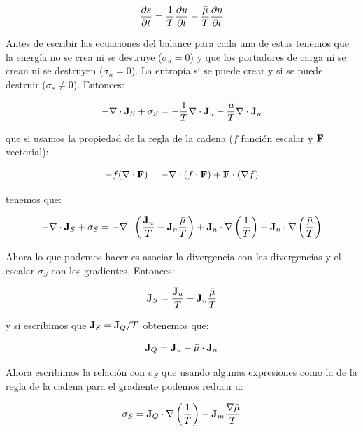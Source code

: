 \documentclass[12pt,a4paper,oneside]{book}
\begin{document}
\begin{equation}
\frac{\partial s}{\partial t} = \dfrac{1}{T} 
\frac{\partial u}{\partial t} - \dfrac{\bar{\mu}}{T} 
\frac{\partial n}{\partial t}
\end{equation} 

Antes de escribir las ecuaciones del balance para cada una de estas tenemos que la energía no se crea ni se destruye ($\sigma_u = 0$) y que los portadores de carga ni se crean ni se destruyen ($\sigma_n = 0$). La entropía si se puede crear y si se puede destruir ($\sigma_s \neq 0$). Entonces:

\begin{equation}
- \nabla \cdot \textbf{J}_S + \sigma_S = - \dfrac{1}{T} \nabla \cdot  \textbf{J}_u - \dfrac{\bar{\mu}}{T} \nabla \cdot \textbf{J}_n
\end{equation}

que si usamos la propiedad de la regla de la cadena ($f$ función escalar y $\textbf{F}$ vectorial):

$$ - f (\nabla \cdot \textbf{F}) = - \nabla \cdot (f  \cdot \textbf{F}) + \textbf{F} \cdot ( \nabla f ) $$

tenemos que:

\begin{equation}
- \nabla \cdot \textbf{J}_S + \sigma_S = -  \nabla \cdot  \left( \dfrac{\textbf{J}_u}{T} - \textbf{J}_n \dfrac{\bar{\mu}}{T}  \right) + \textbf{J}_u \cdot \nabla \left( \dfrac{1}{T} \right) + \textbf{J}_n \cdot \nabla \left( \dfrac{\bar{\mu}}{T} \right)
\end{equation}

Ahora lo que podemos hacer es asociar la divergencia con las divergencias y el escalar $\sigma_S$ con los gradientes. Entonces:

\begin{equation}
\textbf{J}_S = \dfrac{\textbf{J}_u}{T} - \textbf{J}_n \dfrac{\bar{\mu}}{T}
\end{equation}

y si escribimos que $\textbf{J}_S = \textbf{J}_Q / T$ obtenemos que:


\begin{equation}
\textbf{J}_ Q = \textbf{J}_u- \bar{\mu} \cdot \textbf{J}_n 
\end{equation}

Ahora escribimos la relación con $\sigma_S$ que usando algunas expresiones como la de la regla de la cadena para el gradiente podemos reducir a:

\begin{equation}
\sigma_S = \textbf{J}_Q \cdot \nabla \left( \dfrac{1}{T} \right) - \textbf{J}_m \dfrac{\nabla \bar{\mu}}{T}
\end{equation}
\end{document}
